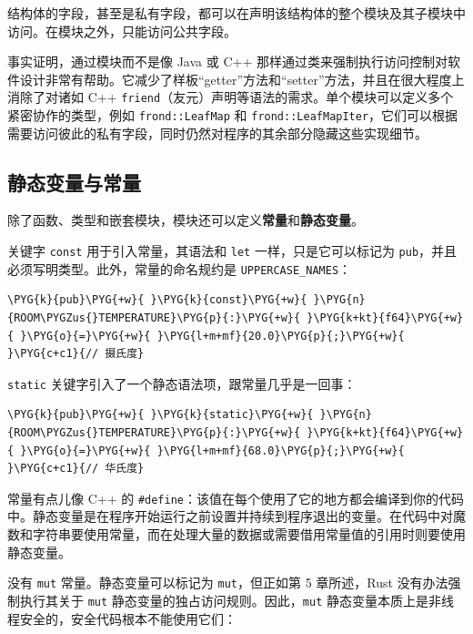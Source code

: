 结构体的字段，甚至是私有字段，都可以在声明该结构体的整个模块及其子模块中访问。在模块之外，只能访问公共字段。

事实证明，通过模块而不是像 Java 或 C++ 那样通过类来强制执行访问控制对软件设计非常有帮助。它减少了样板“getter”方法和“setter”方法，并且在很大程度上消除了对诸如 C++ \texttt{friend}（友元）声明等语法的需求。单个模块可以定义多个紧密协作的类型，例如 \texttt{frond::LeafMap} 和 \texttt{frond::LeafMapIter}，它们可以根据需要访问彼此的私有字段，同时仍然对程序的其余部分隐藏这些实现细节。

\subsection{静态变量与常量}

除了函数、类型和嵌套模块，模块还可以定义\textbf{常量}和\textbf{静态变量}。

关键字 \texttt{const} 用于引入常量，其语法和 \texttt{let} 一样，只是它可以标记为 \texttt{pub}，并且必须写明类型。此外，常量的命名规约是 \texttt{UPPERCASE\_NAMES}：

\begin{Verbatim}[commandchars=\\\{\},breaklines=true,breakanywhere=true,fontsize=\codefont,xleftmargin=17bp]
\PYG{k}{pub}\PYG{+w}{ }\PYG{k}{const}\PYG{+w}{ }\PYG{n}{ROOM\PYGZus{}TEMPERATURE}\PYG{p}{:}\PYG{+w}{ }\PYG{k+kt}{f64}\PYG{+w}{ }\PYG{o}{=}\PYG{+w}{ }\PYG{l+m+mf}{20.0}\PYG{p}{;}\PYG{+w}{  }\PYG{c+c1}{// 摄氏度}
\end{Verbatim}

\texttt{static} 关键字引入了一个静态语法项，跟常量几乎是一回事：

\begin{Verbatim}[commandchars=\\\{\},breaklines=true,breakanywhere=true,fontsize=\codefont,xleftmargin=17bp]
\PYG{k}{pub}\PYG{+w}{ }\PYG{k}{static}\PYG{+w}{ }\PYG{n}{ROOM\PYGZus{}TEMPERATURE}\PYG{p}{:}\PYG{+w}{ }\PYG{k+kt}{f64}\PYG{+w}{ }\PYG{o}{=}\PYG{+w}{ }\PYG{l+m+mf}{68.0}\PYG{p}{;}\PYG{+w}{  }\PYG{c+c1}{// 华氏度}
\end{Verbatim}

常量有点儿像 C++ 的 \texttt{\#define}：该值在每个使用了它的地方都会编译到你的代码中。静态变量是在程序开始运行之前设置并持续到程序退出的变量。在代码中对魔数和字符串要使用常量，而在处理大量的数据或需要借用常量值的引用时则要使用静态变量。

没有 \texttt{mut} 常量。静态变量可以标记为 \texttt{mut}，但正如第 5 章所述，Rust 没有办法强制执行其关于 \texttt{mut} 静态变量的独占访问规则。因此，\texttt{mut} 静态变量本质上是非线程安全的，安全代码根本不能使用它们：

